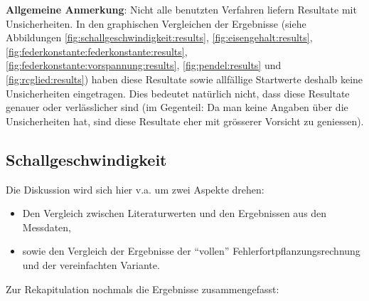 \textbf{Allgemeine   Anmerkung}: Nicht   alle  benutzten   Verfahren   liefern
Resultate mit  Unsicherheiten. In den  graphischen Vergleichen  der Ergebnisse
(siehe Abbildungen
\ref{fig:schallgeschwindigkeit:results},
\ref{fig:eisengehalt:results},
\ref{fig:federkonstante:federkonstante:results},
\ref{fig:federkonstante:vorspannung:results},
\ref{fig:pendel:results} und
\ref{fig:rcglied:results})
haben   diese   Resultate   sowie  allf\"allige   Startwerte   deshalb   keine
Unsicherheiten  eingetragen. Dies  bedeutet   nat\"urlich  nicht,  dass  diese
Resultate  genauer  oder  verl\"asslicher  sind (im  Gegenteil: Da  man  keine
Angaben  \"uber  die  Unsicherheiten  hat,   sind  diese  Resultate  eher  mit
gr\"osserer Vorsicht zu geniessen).


\subsection{Schallgeschwindigkeit}

Die Diskussion wird sich hier v.a. um zwei Aspekte drehen:

\begin{itemize}
    \item
        Den  Vergleich zwischen  Literaturwerten und  den Ergebnissen  aus den
        Messdaten,
    \item
        sowie     den    Vergleich     der    Ergebnisse     der    ``vollen''
        Fehlerfortpflanzungsrechnung und der vereinfachten Variante.
\end{itemize}

Zur Rekapitulation nochmals die Ergebnisse zusammengefasst:

